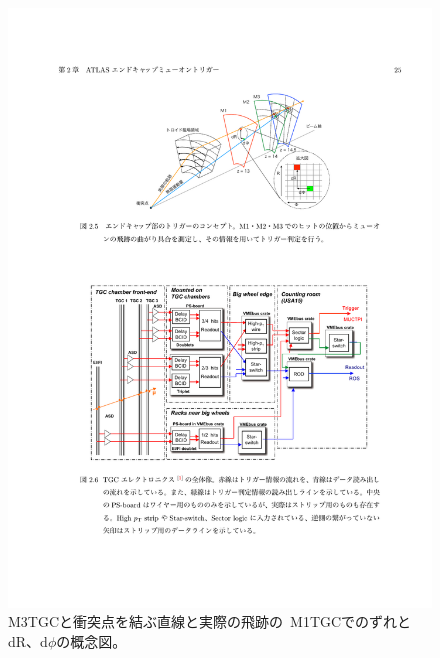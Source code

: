 \begin{figure}[h]
  \centering
  \includegraphics[clip, width=12cm]{fig/3/akatsuka_mt_trigger_scheme.pdf}
  \caption{M3TGCと衝突点を結ぶ直線と実際の飛跡の~M1TGCでのずれとdR、d$\phi$の概念図\cite{article:akatsuka}。}
  \label{fig:3-4}
\end{figure}

